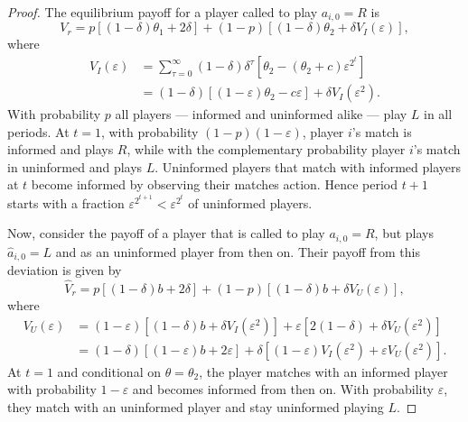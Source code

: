 \documentclass[12pt,letterpaper]{article}
\newtheorem{lemma}{\hskip\parindent\bf{Lemma}}
\begin{document}
\begin{lemma}
\begin{proof}
        The equilibrium payoff for a player called to play $a_{i,0}=R$ is \begin{equation*}
            V_r = p[(1-\delta) \theta_1 + 2\delta] + (1-p)[(1-\delta) \theta_2+\delta V_I(\varepsilon)],
        \end{equation*} where \begin{align*}
            V_I(\varepsilon) &= \sum_{\tau=0}^\infty (1-\delta)\delta^\tau[\theta_2-(\theta_2+c)\varepsilon^{2^t}] \\
            &=(1-\delta)[(1-\varepsilon)\theta_2-c\varepsilon]+\delta V_I(\varepsilon^2).
        \end{align*} With probability $p$ all players --- informed and uninformed alike --- play $L$ in all periods. At $t=1$, with probability $(1-p)(1-\varepsilon)$, player $i$'s match is informed and plays $R$, while with the complementary probability player $i$'s match in uninformed and plays $L$. Uninformed players that match with informed players at $t$ become informed by observing their matches action. Hence period $t+1$ starts with a fraction $\varepsilon^{2^{t+1}}<\varepsilon^{2^t}$ of uninformed players.
        
        Now, consider the payoff of a player that is called to play $a_{i,0}=R$, but plays $\hat{a}_{i,0}=L$ and as an uninformed player from then on. Their payoff from this deviation is given by \begin{equation*}
            \hat{V}_r=p[(1-\delta)b+2\delta] + (1-p)[(1-\delta)b + \delta V_U(\varepsilon)],
        \end{equation*} where \begin{align*}
            V_U(\varepsilon)&=(1-\varepsilon)[(1-\delta)b+\delta V_I(\varepsilon^2)] + \varepsilon[2(1-\delta) + \delta V_U(\varepsilon^2)]\\
            &=(1-\delta)[(1-\varepsilon)b+2\varepsilon]+\delta[(1-\varepsilon)V_I(\varepsilon^2) + \varepsilon V_U(\varepsilon^2)].
        \end{align*} At $t=1$ and conditional on $\theta=\theta_2$, the player matches with an informed player with probability $1-\varepsilon$ and becomes informed from then on. With probability $\varepsilon$, they match with an uninformed player and stay uninformed playing $L$.


\end{proof}
\end{lemma}
\end{document}
